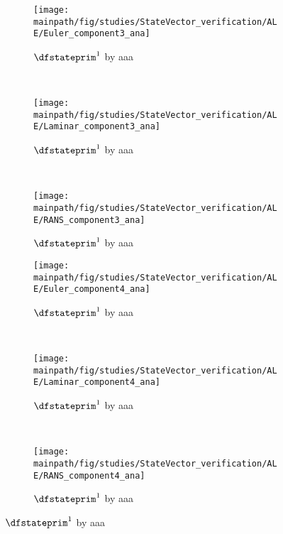 \documentclass[../main.tex]{subfiles}
\begin{document}
\begin{figure}[t!]
    \begin{subfigure}[t]{0.33\textwidth}
        \centering
        \texttt{[image: \\mainpath/fig/studies/StateVector\_verification/ALE/Euler\_component3\_ana]}
        \caption{$\dfstateprim^1$ by aaa}
    \end{subfigure}%
    ~ 
    \begin{subfigure}[t]{0.33\textwidth}
        \centering
        \texttt{[image: \\mainpath/fig/studies/StateVector\_verification/ALE/Laminar\_component3\_ana]}
        \caption{$\dfstateprim^1$ by aaa}
    \end{subfigure}%
    ~ 
    \begin{subfigure}[t]{0.33\textwidth}
        \centering
        \texttt{[image: \\mainpath/fig/studies/StateVector\_verification/ALE/RANS\_component3\_ana]}
        \caption{$\dfstateprim^1$ by aaa}
    \end{subfigure}
    
    \begin{subfigure}[t]{0.33\textwidth}
        \centering
        \texttt{[image: \\mainpath/fig/studies/StateVector\_verification/ALE/Euler\_component4\_ana]}
        \caption{$\dfstateprim^1$ by aaa}
    \end{subfigure}%
    ~ 
    \begin{subfigure}[t]{0.33\textwidth}
        \centering
        \texttt{[image: \\mainpath/fig/studies/StateVector\_verification/ALE/Laminar\_component4\_ana]}
        \caption{$\dfstateprim^1$ by aaa}
    \end{subfigure}%
    ~ 
    \begin{subfigure}[t]{0.33\textwidth}
        \centering
        \texttt{[image: \\mainpath/fig/studies/StateVector\_verification/ALE/RANS\_component4\_ana]}
        \caption{$\dfstateprim^1$ by aaa}
    \end{subfigure}
    

\end{figure}
\end{document}
